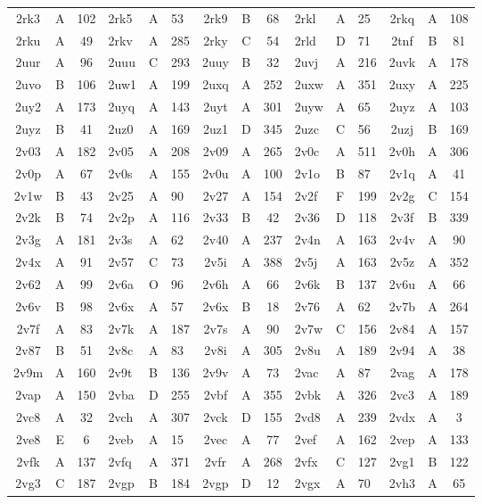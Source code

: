 \begin{longtable}{|c|c|c| a|a|a| c|c|c| a|a|a| c|c|c|}
2rk3 & A & 102 & 2rk5 & A & 53 & 2rk9 & B & 68 & 2rkl & A & 25 & 2rkq & A & 108\\
2rku & A & 49 & 2rkv & A & 285 & 2rky & C & 54 & 2rld & D & 71 & 2tnf & B & 81\\
2uur & A & 96 & 2uuu & C & 293 & 2uuy & B & 32 & 2uvj & A & 216 & 2uvk & A & 178\\
2uvo & B & 106 & 2uw1 & A & 199 & 2uxq & A & 252 & 2uxw & A & 351 & 2uxy & A & 225\\
2uy2 & A & 173 & 2uyq & A & 143 & 2uyt & A & 301 & 2uyw & A & 65 & 2uyz & A & 103\\
2uyz & B & 41 & 2uz0 & A & 169 & 2uz1 & D & 345 & 2uzc & C & 56 & 2uzj & B & 169\\
2v03 & A & 182 & 2v05 & A & 208 & 2v09 & A & 265 & 2v0c & A & 511 & 2v0h & A & 306\\
2v0p & A & 67 & 2v0s & A & 155 & 2v0u & A & 100 & 2v1o & B & 87 & 2v1q & A & 41\\
2v1w & B & 43 & 2v25 & A & 90 & 2v27 & A & 154 & 2v2f & F & 199 & 2v2g & C & 154\\
2v2k & B & 74 & 2v2p & A & 116 & 2v33 & B & 42 & 2v36 & D & 118 & 2v3f & B & 339\\
2v3g & A & 181 & 2v3s & A & 62 & 2v40 & A & 237 & 2v4n & A & 163 & 2v4v & A & 90\\
2v4x & A & 91 & 2v57 & C & 73 & 2v5i & A & 388 & 2v5j & A & 163 & 2v5z & A & 352\\
2v62 & A & 99 & 2v6a & O & 96 & 2v6h & A & 66 & 2v6k & B & 137 & 2v6u & A & 66\\
2v6v & B & 98 & 2v6x & A & 57 & 2v6x & B & 18 & 2v76 & A & 62 & 2v7b & A & 264\\
2v7f & A & 83 & 2v7k & A & 187 & 2v7s & A & 90 & 2v7w & C & 156 & 2v84 & A & 157\\
2v87 & B & 51 & 2v8c & A & 83 & 2v8i & A & 305 & 2v8u & A & 189 & 2v94 & A & 38\\
2v9m & A & 160 & 2v9t & B & 136 & 2v9v & A & 73 & 2vac & A & 87 & 2vag & A & 178\\
2vap & A & 150 & 2vba & D & 255 & 2vbf & A & 355 & 2vbk & A & 326 & 2vc3 & A & 189\\
2vc8 & A & 32 & 2vch & A & 307 & 2vck & D & 155 & 2vd8 & A & 239 & 2vdx & A & 3\\
2ve8 & E & 6 & 2veb & A & 15 & 2vec & A & 77 & 2vef & A & 162 & 2vep & A & 133\\
2vfk & A & 137 & 2vfq & A & 371 & 2vfr & A & 268 & 2vfx & C & 127 & 2vg1 & B & 122\\
2vg3 & C & 187 & 2vgp & B & 184 & 2vgp & D & 12 & 2vgx & A & 70 & 2vh3 & A & 65\\

\end{longtable}
